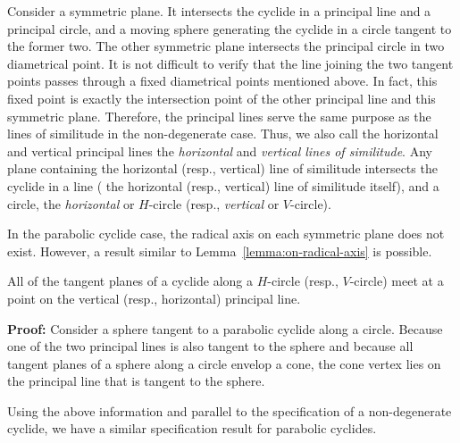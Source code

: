      Consider a symmetric plane.  It intersects the cyclide in a principal 
line and a principal circle, and a moving sphere generating the cyclide in a 
circle tangent to the former two.  The other symmetric plane intersects the
principal circle in two diametrical point.  It is not difficult to verify 
that the line joining the two tangent points passes through a fixed diametrical
points mentioned above.  In fact, this fixed point is exactly the intersection
point of the other principal line and this symmetric plane.  Therefore, the
principal lines serve the same purpose as the lines of similitude in the
non-degenerate case.  Thus, we also call the horizontal and vertical principal
lines the {\em horizontal}
 and 
{\em vertical lines of similitude}.
  Any plane containing the horizontal
(resp., vertical) line of similitude intersects the cyclide in a line (
the horizontal (resp., vertical) line of similitude itself), and a circle,
the {\em horizontal} or $H$-circle
(resp., {\em vertical} or $V$-circle).

     In the parabolic cyclide case, the radical axis on each symmetric plane
does not exist.  However, a result similar to Lemma~\ref{lemma:on-radical-axis}
is possible.  

\begin{lemma}
\label{lemma:on-principal-line}
     All of the tangent planes of a cyclide along a $H$-circle (resp., 
$V$-circle) meet at a point on the vertical (resp., horizontal) principal line.
\end{lemma}
{\bf Proof:} Consider a sphere tangent to a parabolic cyclide along a circle.
Because one of the two principal lines is also tangent to the sphere and 
because all tangent planes of a sphere along a circle envelop a cone, the cone
vertex lies on the principal line that is tangent to the sphere. \QED

     Using the above information and parallel to the specification of a
non-degenerate cyclide, we have a similar specification result for parabolic 
cyclides.

